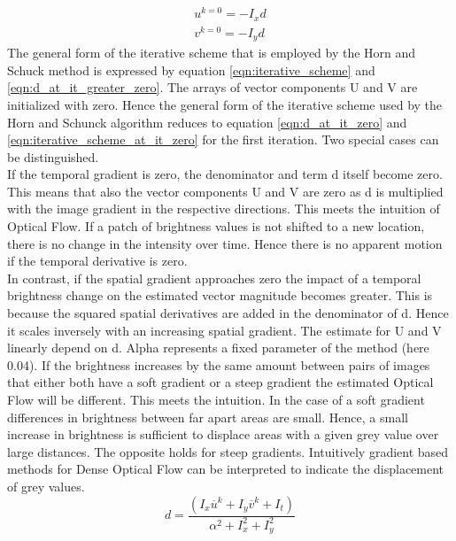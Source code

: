 \begin{equation}
  \begin{array}{l}
    u^{k=0}= - I_x d \\
    v^{k=0}= - I_y d
  \end{array}
\label{eqn:iterative_scheme_at_it_zero}
\end{equation}
The general form of the iterative scheme that is employed by the Horn and Schuck method is expressed by equation \ref{eqn:iterative_scheme} and \ref{eqn:d_at_it_greater_zero}. The arrays of vector components U and V are initialized with zero. Hence the general form of the iterative scheme used by the Horn and Schunck algorithm reduces to equation \ref{eqn:d_at_it_zero} and \ref{eqn:iterative_scheme_at_it_zero} for the first iteration. Two special cases can be distinguished.\\
If the temporal gradient is zero, the denominator and term d itself become zero. This means that also the vector components U and V are zero as d is multiplied with the image gradient in the respective directions. This meets the intuition of Optical Flow. If a patch of brightness values is not shifted to a new location, there is no change in the intensity over time. Hence there is no apparent motion if the temporal derivative is zero.\\
In contrast, if the spatial gradient approaches zero the impact of a temporal brightness change on the estimated vector magnitude becomes greater. This is because the squared spatial derivatives are added in the denominator of d. Hence it scales inversely with an increasing spatial gradient. The estimate for U and V linearly depend on d. Alpha represents a fixed parameter of the method (here 0.04). If the brightness increases by the same amount between pairs of images that either both have a soft gradient or a steep gradient the estimated Optical Flow will be different. This meets the intuition. In the case of a soft gradient differences in brightness between far apart areas are small. Hence, a small increase in brightness is sufficient to displace areas with a given grey value over large distances. The opposite holds for steep gradients. Intuitively gradient based methods for Dense Optical Flow can be interpreted to indicate the displacement of grey values.\\
\begin{equation}
  d = \frac{(I_x\overline{u}^k+I_y\overline{v}^k+I_t)}{\alpha^2+I_x^2+I_y^2}
\label{eqn:d_at_it_greater_zero}
\end{equation}

